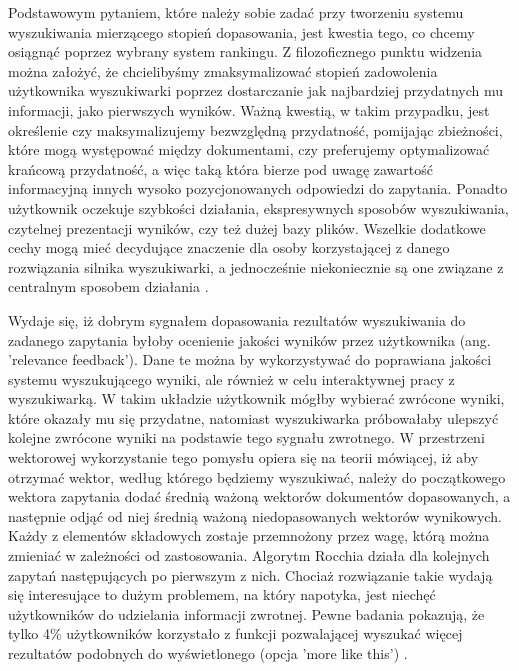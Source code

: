 Podstawowym pytaniem, które należy sobie zadać przy tworzeniu systemu wyszukiwania
mierzącego stopień dopasowania, jest kwestia tego, co chcemy osiągnąć poprzez wybrany system
rankingu. Z filozoficznego punktu widzenia można założyć, że chcielibyśmy zmaksymalizować stopień
zadowolenia użytkownika wyszukiwarki poprzez dostarczanie jak najbardziej przydatnych mu informacji, jako pierwszych wyników. Ważną kwestią, w takim przypadku, jest określenie czy
maksymalizujemy bezwzględną przydatność, pomijając zbieżności, które mogą występować między
dokumentami, czy preferujemy optymalizować krańcową przydatność, a więc taką która bierze pod
uwagę zawartość informacyjną innych wysoko pozycjonowanych odpowiedzi do zapytania. Ponadto
użytkownik oczekuje szybkości działania, ekspresywnych sposobów wyszukiwania, czytelnej
prezentacji wyników, czy też dużej bazy plików. Wszelkie dodatkowe cechy mogą mieć decydujące
znaczenie dla osoby korzystającej z danego rozwiązania silnika wyszukiwarki, a jednocześnie
niekoniecznie są one związane z centralnym sposobem działania \autocite[s. 205-207]{introtoinformationretrieval}.\newline

Wydaje się, iż dobrym sygnałem dopasowania rezultatów wyszukiwania do zadanego
zapytania byłoby ocenienie jakości wyników przez użytkownika (ang. 'relevance feedback'). Dane te
można by wykorzystywać do poprawiana jakości systemu wyszukującego wyniki, ale również w celu interaktywnej pracy z wyszukiwarką. W takim układzie użytkownik mógłby wybierać zwrócone wyniki,
które okazały mu się przydatne, natomiast wyszukiwarka próbowałaby ulepszyć kolejne zwrócone
wyniki na podstawie tego sygnału zwrotnego. W przestrzeni wektorowej wykorzystanie tego pomysłu opiera się na teorii mówiącej, iż aby otrzymać wektor, według którego będziemy
wyszukiwać, należy do początkowego wektora zapytania dodać średnią ważoną wektorów dokumentów dopasowanych, a następnie odjąć od niej
średnią ważoną niedopasowanych wektorów wynikowych. Każdy z
elementów składowych zostaje przemnożony przez wagę, którą można zmieniać w zależności od
zastosowania. Algorytm Rocchia działa dla kolejnych zapytań następujących po pierwszym z nich. Chociaż rozwiązanie takie wydają się interesujące to dużym problemem, na który
napotyka, jest niechęć użytkowników do udzielania informacji zwrotnej. Pewne badania pokazują, że
tylko 4\% użytkowników korzystało z funkcji pozwalającej wyszukać więcej rezultatów podobnych do
wyświetlonego (opcja 'more like this') \autocite[s. 222]{introtoinformationretrieval}. \newline 

